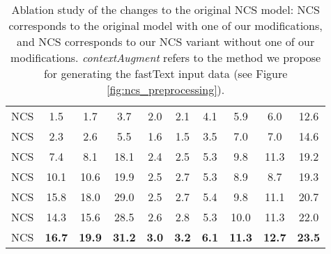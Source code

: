 \documentclass[12pt,conference, onecolumn]{IEEEtran}
\begin{document}
\begin{table}[]
\begin{tabular}{@{}lccccccccc@{}}
NCS      & 1.5                              & 1.7                              & 3.7                               & 2.0                              & 2.1                              & 4.1                               & 5.9                              & 6.0                              & 12.6                              \\
NCS & 2.3                              & 2.6                              & 5.5                               & 1.6                              & 1.5                              & 3.5                               & 7.0                              & 7.0                              & 14.6                              \\ \midrule
NCS           & 7.4                              & 8.1                              & 18.1                              & 2.4                              & 2.5                              & 5.3                               & 9.8                              & 11.3                             & 19.2                              \\
NCS           & 10.1                             & 10.6                             & 19.9                              & 2.5                              & 2.7                              & 5.3                               & 8.9                              & 8.7                              & 19.3                              \\
NCS           & 15.8                             & 18.0                             & 29.0                              & 2.5                              & 2.7                              & 5.4                               & 9.8                              & 11.1                             & 20.7                              \\
NCS      & 14.3                             & 15.6                             & 28.5                              & 2.6                              & 2.8                              & 5.3                               & 10.0                             & 11.3                             & 22.0                              \\
NCS                     & \textbf{16.7}                    & \textbf{19.9}                    & \textbf{31.2}                     & \textbf{3.0}                     & \textbf{3.2}                     & \textbf{6.1}                      & \textbf{11.3}                    & \textbf{12.7}                    & \textbf{23.5}                     \\ \bottomrule
\end{tabular}
\caption{Ablation study of the changes to the original NCS model: NCS corresponds to the original model with one of our modifications, and NCS corresponds to our NCS variant without one of our modifications. \textit{contextAugment} refers to the method we propose for generating the fastText input data (see Figure \ref{fig:ncs_preprocessing}).}
\label{tab:ncs_ablation}
\end{table}
\end{document}
